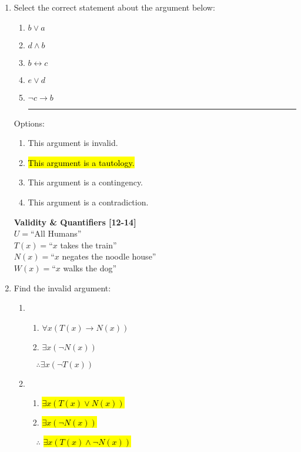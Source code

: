 \documentclass{article}
\renewcommand{\implies}{\rightarrow}
\begin{document}
\begin{enumerate}
\item Select the correct statement about the argument below:
\begin{enumerate}[label =(\arabic*), ref = \arabic*]
	\item $b\lor a$
	\item $d\land b$
	\item $b\leftrightarrow c$
	\item $e\lor d$
	\item $\neg c\implies b$ \hspace{50pt}\vspace{3pt}
	\vspace{5pt} \hrule \vspace{5pt}
\end{enumerate} Options:
\begin{enumerate}
\item This argument is invalid.
\item \hl{This argument is a tautology.}
\item This argument is a contingency.
\item This argument is a contradiction.
\end{enumerate}

\newpage

\textbf{Validity \& Quantifiers [12-14]}
\\$U=$``All Humans''
\\$T(x)=$``$x$ takes the train''
\\$N(x)=$``$x$ negates the noodle house''
\\$W(x)=$``$x$ walks the dog''\\ 
\item Find the invalid argument:
\begin{enumerate}

\item 
\begin{enumerate}[label =(\arabic*), ref = \arabic*]
	\item $\forall x(T(x)\implies N(x))$
	\item $\exists x(\neg N(x))$
\end{enumerate} 
$\quad \therefore \exists x(\neg T(x))$\vspace{3pt}

\item 
\begin{enumerate}[label =(\arabic*), ref = \arabic*]
	\item \protect\hl{$\exists x(T(x)\lor N(x))$}
	\item \protect\hl{$\exists x(\neg N(x))$}
\end{enumerate} 
$\quad \therefore $ \protect\hl{$\exists x(T(x)\land\neg N(x))$}\vspace{3pt}


\end{enumerate}
\end{enumerate}
\end{document}
